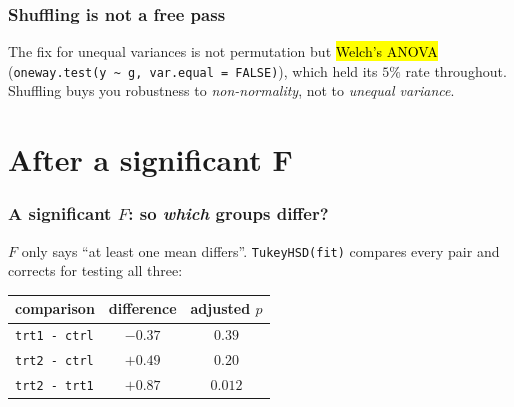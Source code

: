 \documentclass[slidestop,compress,mathserif]{beamer}
\begin{document}
\begin{frame}
\frametitle{Shuffling is not a free pass}


\pause
\vspace{0.3em}
{\small The fix for unequal variances is not permutation but \hl{Welch's ANOVA} (\texttt{oneway.test(y \textasciitilde{} g, var.equal = FALSE)}), which held its $5\%$ rate throughout. Shuffling buys you robustness to \emph{non-normality}, not to \emph{unequal variance}.}

\end{frame}


\section{After a significant F}

\begin{frame}
\frametitle{A significant $F$: so \emph{which} groups differ?}

$F$ only says ``at least one mean differs''. \texttt{TukeyHSD(fit)} compares every pair and corrects for testing all three:

\vspace{0.2em}
\begin{center}
{\small
\begin{tabular}{lcc}
\toprule
comparison & difference & adjusted $p$ \\
\midrule
\texttt{trt1 - ctrl} & $-0.37$ & $0.39$ \\
\texttt{trt2 - ctrl} & $+0.49$ & $0.20$ \\
\texttt{trt2 - trt1} & $+0.87$ & $\mathbf{0.012}$ \\
\bottomrule
\end{tabular}}
\end{center}

\pause
{}

\end{frame}
\end{document}
